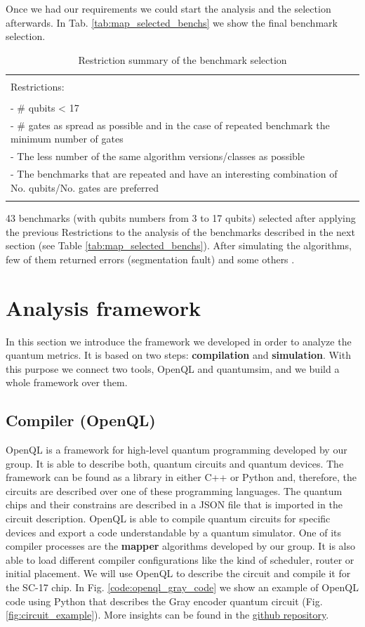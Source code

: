 Once we had our requirements we could start the analysis and the selection afterwards.
In Tab. \ref{tab:map_selected_benchs} we show the final benchmark selection.
\begin{table}[htbp]
\caption{\label{tab:org01a2106}
Restriction summary of the benchmark selection}
\centering
\begin{tabular}{|l|}
\hline
\\
Restrictions:\\
\\
- \# qubits < 17\\
- \# gates as spread as possible and in the case of repeated benchmark the minimum number of gates\\
- The less number of the same algorithm versions/classes as possible\\
- The benchmarks that are repeated and have an interesting combination of No. qubits/No. gates are  preferred\\
\\
\hline
\end{tabular}
\end{table}
43 benchmarks (with qubits numbers from 3 to 17 qubits) selected after applying the previous Restrictions to the analysis of the benchmarks described in the next section (see Table \ref{tab:map_selected_benchs}).
After simulating the algorithms, few of them returned errors (segmentation fault) and some others .

\section*{Analysis framework}
\label{sec:orgf36b625}
In this section we introduce the framework we developed in order to analyze the quantum metrics.
It is based on two steps: \textbf{compilation} and \textbf{simulation}.
With this purpose we connect two tools, OpenQL and quantumsim, and we build a whole framework over them.

\subsection*{Compiler (OpenQL)}
\label{sec:org6f76046}
OpenQL is a framework for high-level quantum programming developed by our group.
It is able to describe both, quantum circuits and quantum devices.
The framework can be found as a library in either C++ or Python and, therefore, the circuits are described over one of these programming languages.
The quantum chips and their constrains are described in a JSON file that is imported in the circuit description.
OpenQL is able to compile quantum circuits for specific devices and export a code understandable by a quantum simulator.
One of its compiler processes are the \textbf{mapper} algorithms developed by our group.
It is also able to load different compiler configurations like the kind of scheduler, router or initial placement.
We will use OpenQL to describe the circuit and compile it for the SC-17 chip.
In Fig. \ref{code:openql_gray_code} we show an example of OpenQL code using Python that describes the Gray encoder quantum circuit (Fig. \ref{fig:circuit_example}).
More insights can be found in the \href{https://github.com/QE-Lab/OpenQL}{github repository}.

